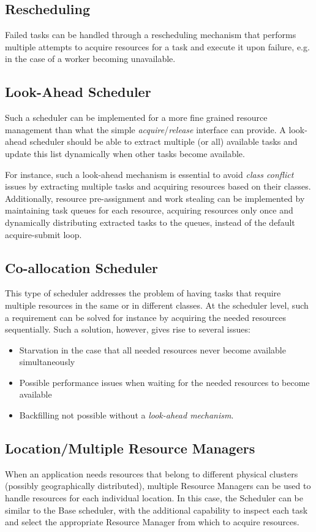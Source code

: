 \documentclass[10pt]{article}
\begin{document}
\subsection{Rescheduling}
Failed tasks can be handled through a rescheduling mechanism that performs
multiple attempts to acquire resources for a task and execute it upon failure,
e.g. in the case of a worker becoming unavailable. 

\subsection{Look-Ahead Scheduler}

Such a scheduler can be implemented for a more fine grained resource management
than what the simple \emph{acquire}/\emph{release} interface can provide. A
look-ahead scheduler should be able to extract multiple (or all) available tasks
and update this list dynamically when other tasks become available.

For instance, such a look-ahead mechanism is essential to avoid \emph{class
conflict} issues by extracting multiple tasks and acquiring resources based on
their classes.
Additionally, resource pre-assignment and work stealing can be implemented by
maintaining task queues for each resource, acquiring resources only once and
dynamically distributing extracted tasks to the queues, instead of the default
acquire-submit loop.




\subsection{Co-allocation Scheduler}
This type of scheduler addresses the problem of having tasks that require
multiple resources in the same or in different classes. 
At the scheduler level, such a requirement can be solved for instance by
acquiring the needed resources sequentially.
Such a solution, however, gives rise to several issues:
\begin{itemize}
    \item Starvation in the case that all needed resources never become
    available simultaneously
    \item Possible performance issues when waiting for the needed resources to
    become available
    \item Backfilling not possible without a \emph{look-ahead mechanism}.
\end{itemize}

\subsection{Location/Multiple Resource Managers}
\label{sec:localtionsched}
When an application needs resources that belong to different physical clusters
(possibly geographically distributed), multiple Resource Managers can be used to
handle resources for each individual location.
In this case, the Scheduler can be similar to the Base scheduler, with the
additional capability to inspect each task and select the appropriate Resource
Manager from which to acquire resources. 
\end{document}
